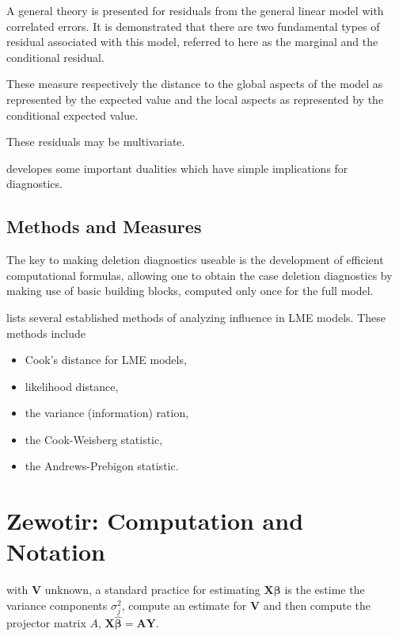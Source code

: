 \documentclass[12pt, a4paper]{article}
\begin{document}
A general theory is presented for residuals from the general linear model with correlated errors.
It is demonstrated that there are two fundamental types of residual associated with this model,
referred to here as the marginal and the conditional residual.


These measure respectively the distance to the global aspects of the model as represented by the expected value
and the local aspects as represented by the conditional expected value.


These residuals may be multivariate.


\citet{HaslettHayes} developes some important dualities which have simple implications for diagnostics.


\subsection{Methods and Measures}
The key to making deletion diagnostics useable is the development of efficient computational formulas, allowing one to obtain the  case deletion diagnostics by making use of basic building blocks, computed only once for the full model.

\citet{Zewotir} lists several established methods of analyzing influence in LME models. These methods include \begin{itemize}
	\item Cook's distance for LME models,
	\item {} likelihood distance,
	\item the variance (information) ration,
	\item the  Cook-Weisberg statistic,
	\item the  Andrews-Prebigon statistic.
\end{itemize}




\section{Zewotir: Computation and Notation } %
with $\boldsymbol{V}$ unknown, a standard practice for estimating $\boldsymbol{X \beta}$ is the estime the variance components $\sigma^2_j$,
compute an estimate for $\boldsymbol{V}$ and then compute the projector matrix $A$, $\boldsymbol{X \hat{\beta}}  = \boldsymbol{AY}$.
\end{document}
